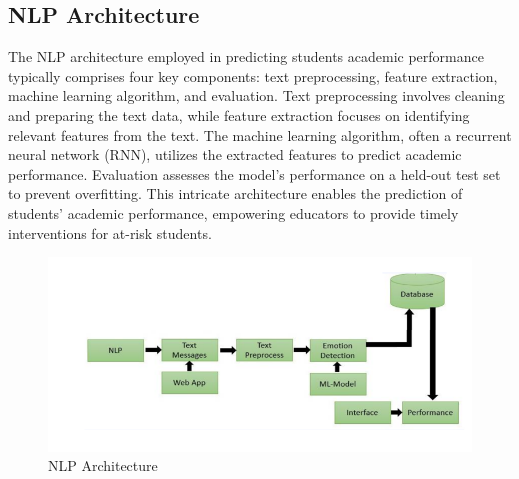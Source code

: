 \subsection{NLP Architecture}
\par \hspace{1cm}The NLP architecture employed in predicting students academic performance typically comprises four key components: text preprocessing, feature extraction, machine learning algorithm, and evaluation. Text preprocessing involves cleaning and preparing the text data, while feature extraction focuses on identifying relevant features from the text. The machine learning algorithm, often a recurrent neural network (RNN), utilizes the extracted features to predict academic performance. Evaluation assesses the model's performance on a held-out test set to prevent overfitting. This intricate architecture enables the prediction of students' academic performance, empowering educators to provide timely interventions for at-risk students.
\begin{figure}[!ht]
\centering
\includegraphics[width=125mm]{archhhh.PNG}
\caption{NLP Architecture}
\end{figure} 

